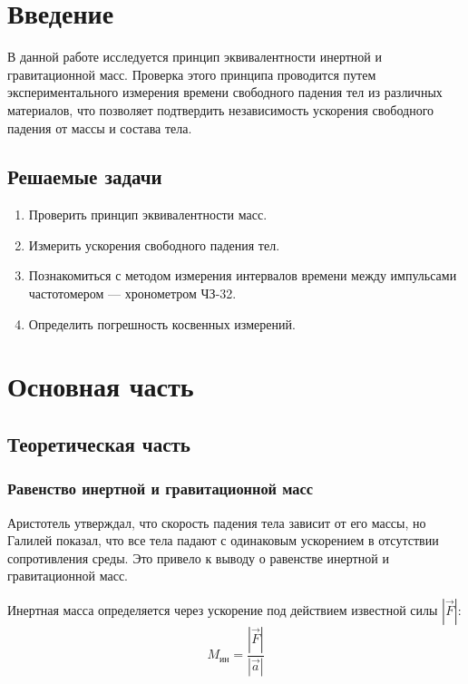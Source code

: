 \section{Введение}

В данной работе исследуется принцип эквивалентности инертной и гравитационной масс. Проверка этого принципа проводится путем экспериментального измерения времени свободного падения тел из различных материалов, что позволяет подтвердить независимость ускорения свободного падения от массы и состава тела.

\subsection{Решаемые задачи}

\begin{enumerate}
    \item Проверить принцип эквивалентности масс.
    \item Измерить ускорения свободного падения тел.
    \item Познакомиться с методом измерения интервалов времени между импульсами частотомером — хронометром ЧЗ-32.
    \item Определить погрешность косвенных измерений.
\end{enumerate}

\section{Основная часть}

\subsection{Теоретическая часть}

\subsubsection{Равенство инертной и гравитационной масс}

Аристотель утверждал, что скорость падения тела зависит от его массы, но Галилей показал, что все тела падают с одинаковым ускорением в отсутствии сопротивления среды. Это привело к выводу о равенстве инертной и гравитационной масс.

Инертная масса определяется через ускорение под действием известной силы $|\vec{F}|$:
\begin{equation}
   M_{\text{ин}} = \frac{|\vec{F}|}{|\vec{a}|}
\end{equation}

